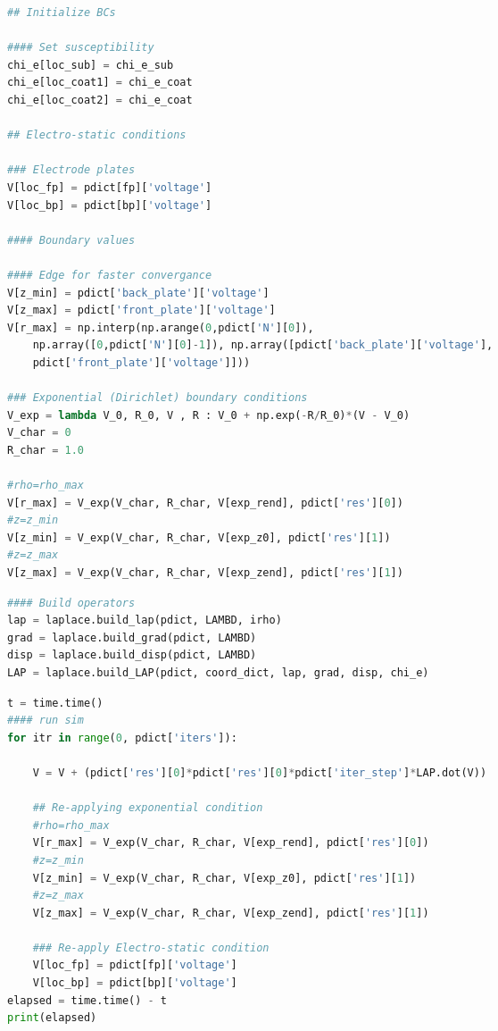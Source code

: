 \begin{spacing}{1.2} \begin{lstlisting}[frame=single, language=Python]
## Initialize BCs

#### Set susceptibility
chi_e[loc_sub] = chi_e_sub
chi_e[loc_coat1] = chi_e_coat
chi_e[loc_coat2] = chi_e_coat

## Electro-static conditions

### Electrode plates
V[loc_fp] = pdict[fp]['voltage']
V[loc_bp] = pdict[bp]['voltage']

#### Boundary values

#### Edge for faster convergance
V[z_min] = pdict['back_plate']['voltage']
V[z_max] = pdict['front_plate']['voltage']
V[r_max] = np.interp(np.arange(0,pdict['N'][0]), 
    np.array([0,pdict['N'][0]-1]), np.array([pdict['back_plate']['voltage'], 
    pdict['front_plate']['voltage']]))

### Exponential (Dirichlet) boundary conditions
V_exp = lambda V_0, R_0, V , R : V_0 + np.exp(-R/R_0)*(V - V_0) 
V_char = 0
R_char = 1.0

#rho=rho_max
V[r_max] = V_exp(V_char, R_char, V[exp_rend], pdict['res'][0])
#z=z_min
V[z_min] = V_exp(V_char, R_char, V[exp_z0], pdict['res'][1])
#z=z_max
V[z_max] = V_exp(V_char, R_char, V[exp_zend], pdict['res'][1])
\end{lstlisting} \end{spacing}

\begin{spacing}{1.2} \begin{lstlisting}[frame=single, language=Python]
#### Build operators
lap = laplace.build_lap(pdict, LAMBD, irho)
grad = laplace.build_grad(pdict, LAMBD)
disp = laplace.build_disp(pdict, LAMBD)
LAP = laplace.build_LAP(pdict, coord_dict, lap, grad, disp, chi_e)
\end{lstlisting} \end{spacing}

\begin{spacing}{1.2} \begin{lstlisting}[frame=single, language=Python]
t = time.time() 
#### run sim
for itr in range(0, pdict['iters']):
    
    V = V + (pdict['res'][0]*pdict['res'][0]*pdict['iter_step']*LAP.dot(V))
    
    ## Re-applying exponential condition
    #rho=rho_max
    V[r_max] = V_exp(V_char, R_char, V[exp_rend], pdict['res'][0])
    #z=z_min
    V[z_min] = V_exp(V_char, R_char, V[exp_z0], pdict['res'][1])
    #z=z_max
    V[z_max] = V_exp(V_char, R_char, V[exp_zend], pdict['res'][1])
    
    ### Re-apply Electro-static condition
    V[loc_fp] = pdict[fp]['voltage']
    V[loc_bp] = pdict[bp]['voltage']
elapsed = time.time() - t
print(elapsed)
\end{lstlisting} \end{spacing}

